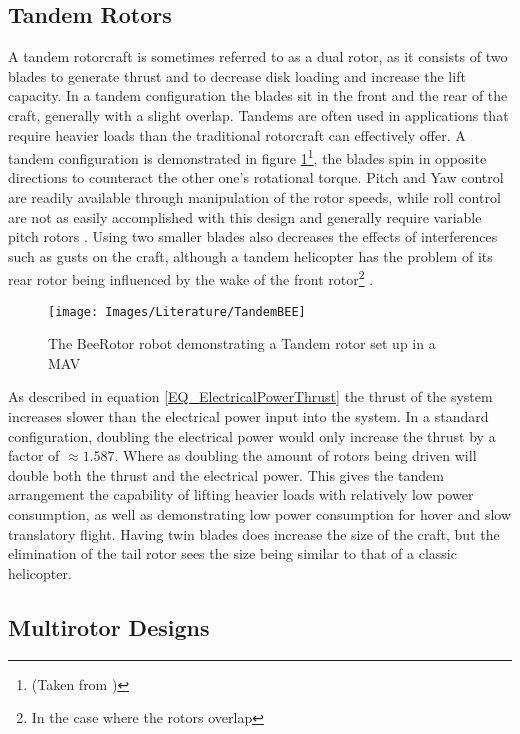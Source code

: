 \subsection{Tandem Rotors}

A tandem rotorcraft is sometimes referred to as a dual rotor, as it consists of two blades to generate thrust and to decrease disk loading and increase the lift capacity. In a tandem configuration the blades sit in the front and the rear of the craft, generally with a slight overlap. Tandems are often used in applications that require heavier loads than the traditional rotorcraft can effectively offer. A tandem configuration is demonstrated in figure \ref{IM_Tandem}\footnote{(Taken from \cite{Bee})}, the blades spin in opposite directions to counteract the other one's rotational torque. Pitch and Yaw control are readily available through manipulation of the rotor speeds, while roll control are not as easily accomplished with this design and generally require variable pitch rotors \cite{Oh2005}. Using two smaller blades also decreases the effects of interferences such as gusts on the craft, although a tandem helicopter has the problem of its rear rotor being influenced by the wake of the front rotor\footnote{In the case where the rotors overlap} \cite{Camrad1}. 

\begin{figure}[H]
\centering
\texttt{[image: Images/Literature/TandemBEE]}     
\caption{The BeeRotor robot demonstrating a Tandem rotor set up in a MAV \cite{Bee}}
\label{IM_Tandem}
\end{figure}


As described in equation \eqref{EQ_ElectricalPowerThrust} the thrust of the system increases slower than the electrical power input into the system. In a standard configuration, doubling the electrical power would only increase the thrust by a factor of $\approx 1.587$. Where as doubling the amount of rotors being driven will double both the thrust and the electrical power. This gives the tandem arrangement the capability of lifting heavier loads with relatively low power consumption, as well as demonstrating low power consumption for hover and slow translatory flight. Having twin blades does increase the size of the craft, but the elimination of the tail rotor sees the size being similar to that of a classic helicopter.


\subsection{Multirotor Designs}

